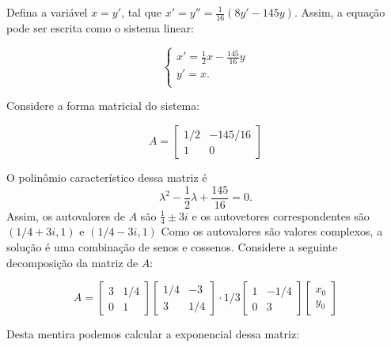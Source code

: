 \documentclass[a4paper,12pt]{article}
\theoremstyle{exer}
\theoremstyle{definition}
\begin{document}
Defina a variável $x = y'$, tal que $x' = y'' = \frac{1}{16}(8y' - 145y)$.
Assim, a equação pode ser escrita como o sistema linear:

$$
\begin{cases} 
x' = \frac{1}{2}x - \frac{145}{16}y \\ 
y' = x. \\ 
\end{cases}
$$

Considere a forma matricial do sistema: 

$$
A = \begin{bmatrix} 1/2 & -145/16 \\ 1 & 0 \end{bmatrix}
$$

O polinômio característico dessa matriz é 
$$\lambda^2 - \frac{1}{2}\lambda + \frac{145}{16} = 0.$$ 
Assim, os autovalores de $A$ são $\frac{1}{4} \pm 3i$ e os autovetores correspondentes são $(1/4 + 3i, 1)$ e $(1/4 - 3i, 1)$  
Como os autovalores são valores complexos, a solução é uma combinação de senos
e cossenos. Considere a seguinte decomposição da matriz de $A$:

$$
A = \begin{bmatrix} 3 & 1/4 \\ 0 & 1 \end{bmatrix}\begin{bmatrix} 1/4 & -3 \\ 3 & 1/4 \end{bmatrix}\cdot 1/3\begin{bmatrix} 1 & -1/4 \\ 0 & 3 \end{bmatrix}\begin{bmatrix} x_0 \\ y_0 \end{bmatrix}
$$

Desta mentira podemos calcular a exponencial dessa matriz:
\end{document}
